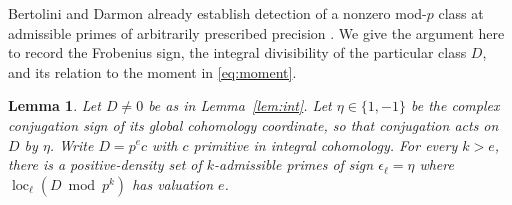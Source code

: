 \documentclass[11pt]{article}
\newtheorem{lemma}[theorem]{Lemma}
\newcommand{\loc}{\operatorname{loc}}
\begin{document}
Bertolini and Darmon already establish detection of a nonzero mod-\(p\) class at admissible primes of arbitrarily prescribed precision \cite[Thm.~3.2]{BD}. We give the argument here to record the Frobenius sign, the integral divisibility of the particular class \(D\), and its relation to the moment in \eqref{eq:moment}.

\begin{lemma}\label{lem:frob}
Let \(D\neq0\) be as in Lemma~\ref{lem:int}. Let \(\eta\in\{1,-1\}\) be the complex conjugation sign of its global cohomology coordinate, so that conjugation acts on \(D\) by \(\eta\). Write \(D=p^e c\) with \(c\) primitive in integral cohomology. For every \(k>e\), there is a positive-density set of \(k\)-admissible primes of sign \(\epsilon_\ell=\eta\) where \(\loc_\ell(D\bmod p^k)\) has valuation \(e\).
\end{lemma}
\end{document}
